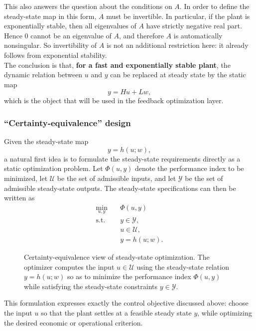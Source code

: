 This also answers the question about the conditions on $A$. In order to define the steady-state map in this form, $A$ must be invertible. In particular, if the plant is exponentially stable, then all eigenvalues of $A$ have strictly negative real part. Hence $0$ cannot be an eigenvalue of $A$, and therefore $A$ is automatically nonsingular. So invertibility of $A$ is not an additional restriction here: it already follows from exponential stability.\\

The conclusion is that, \textbf{for a fast and exponentially stable plant}, the dynamic relation between $u$ and $y$ can be replaced at steady state by the static map
\[
y = Hu + Lw,
\]
which is the object that will be used in the feedback optimization layer.

\subsubsection{``Certainty-equivalence'' design}

Given the steady-state map
\[
y = h(u;w),
\]
a natural first idea is to formulate the steady-state requirements directly as a static optimization problem. Let $\Phi(u,y)$ denote the performance index to be minimized, let $\mathcal U$ be the set of admissible inputs, and let $\mathcal Y$ be the set of admissible steady-state outputs. The steady-state specifications can then be written as
\[
\begin{aligned}
\min_{u,y}\quad & \Phi(u,y)\\
\text{s.t.}\quad & y \in \mathcal Y,\\
& u \in \mathcal U,\\
& y = h(u;w).
\end{aligned}
\]

\begin{figure}[!h]
    \centering
    
    \caption{Certainty-equivalence view of steady-state optimization. The optimizer computes the input $u \in \mathcal U$ using the steady-state relation $y = h(u;w)$ so as to minimize the performance index $\Phi(u,y)$ while satisfying the steady-state constraints $y \in \mathcal Y$.}
    \label{fig:certainty-equivalence}
\end{figure}
This formulation expresses exactly the control objective discussed above: choose the input $u$ so that the plant settles at a feasible steady state $y$, while optimizing the desired economic or operational criterion.\\

